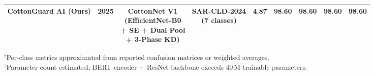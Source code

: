 \documentclass[journal,10pt,twocolumn]{IEEEtran}
\begin{document}
\begin{table}[!ht]
{\begin{tabular}{@{}l c c c c c c c c@{}}
\addlinespace[2pt]
\midrule

\textbf{CottonGuard AI (Ours)}
  & \textbf{2025}
  & \makecell{\textbf{CottonNet V1}\\(EfficientNet-B0\\+ SE + Dual Pool\\+ 3-Phase KD)}
  & \makecell{\textbf{SAR-CLD-2024}\\(\textbf{7 classes})}
  & \textbf{4.87}
  & \textbf{98.60}
  & \textbf{98.60}
  & 98.60
  & \textbf{98.60} \\

\bottomrule
\end{tabular}%
}

\vspace{4pt}
{\footnotesize
$^{\dagger}$Per-class metrics approximated from reported confusion matrices or weighted averages.\\
$^{\ddagger}$Parameter count estimated; BERT encoder + ResNet backbone exceeds 40\,M trainable parameters.
}
\end{table}
\end{document}
